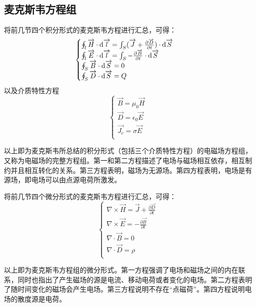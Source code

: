 \documentclass[UTF8,a4paper,11pt]{article}
\begin{document}
\subsection{麦克斯韦方程组}
将前几节四个积分形式的麦克斯韦方程进行汇总，可得：
\begin{equation}
\begin{cases}
\oint_l\overrightarrow{H}\cdot{\rm d}\overrightarrow{l}=\int_S(\overrightarrow{J}+\frac{\partial \overrightarrow{D}}{\partial t})\cdot{\rm d}\overrightarrow{S}\\
\oint_l\overrightarrow{E}\cdot{\rm d}\overrightarrow{l}=\int_S-\frac{\partial\overrightarrow{B}}{\partial t}\cdot{\rm d}\overrightarrow{S}\\
\oint_S\overrightarrow{B}\cdot{\rm d}\overrightarrow{S}=0\\
\oint_S\overrightarrow{D}\cdot{\rm d}\overrightarrow{S}=Q\\
\end{cases}
\end{equation}
以及介质特性方程
\begin{equation}
\begin{cases}
\overrightarrow{B}=\mu_0\overrightarrow{H}\\
\overrightarrow{D}=\epsilon_0\overrightarrow{E}\\
\overrightarrow{J_c}=\sigma\overrightarrow{E}\\
\end{cases}
\end{equation}

以上即为麦克斯韦所总结的积分形式（包括三个介质特性方程）的电磁场方程组，又称为电磁场的完整方程组。第一和第二方程描述了电场与磁场相互依存，相互制约并且相互转化的关系。第三方程表明，磁场为无源场。第四方程表明，电场是有源场，即电场可以由点源电荷所激发。

将前几节四个微分形式的麦克斯韦方程进行汇总，可得：
\begin{equation}
\begin{cases}
\nabla\times\overrightarrow{H}=\overrightarrow{J}+\frac{\partial \overrightarrow{D}}{\partial t}\\
\nabla\times\overrightarrow{E}=-\frac{\partial\overrightarrow{B}}{\partial t}\\
\nabla\cdot\overrightarrow{B}=0\\
\nabla\cdot\overrightarrow{D}=\rho\\
\end{cases}
\end{equation}

以上即为麦克斯韦方程组的微分形式。第一方程强调了电场和磁场之间的内在联系，同时也指出了产生磁场的源是电流、移动电荷或者变化的电场。第二方程表明了随时间变化的磁场会产生电场。第三方程说明不存在“点磁荷”。第四方程说明电场的散度源是电荷。
\end{document}
